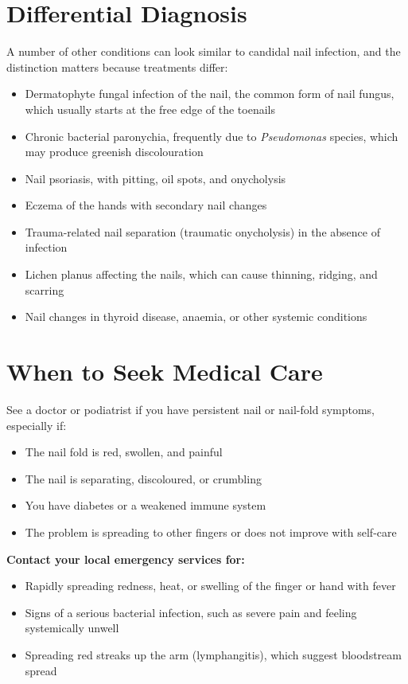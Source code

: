 \section*{Differential Diagnosis}
A number of other conditions can look similar to candidal nail infection, and the distinction matters because treatments differ:
\begin{itemize}
    \item Dermatophyte fungal infection of the nail, the common form of nail fungus, which usually starts at the free edge of the toenails
    \item Chronic bacterial paronychia, frequently due to \textit{Pseudomonas} species, which may produce greenish discolouration
    \item Nail psoriasis, with pitting, oil spots, and onycholysis
    \item Eczema of the hands with secondary nail changes
    \item Trauma-related nail separation (traumatic onycholysis) in the absence of infection
    \item Lichen planus affecting the nails, which can cause thinning, ridging, and scarring
    \item Nail changes in thyroid disease, anaemia, or other systemic conditions
\end{itemize}

\section*{When to Seek Medical Care}
See a doctor or podiatrist if you have persistent nail or nail-fold symptoms, especially if:
\begin{itemize}
    \item The nail fold is red, swollen, and painful
    \item The nail is separating, discoloured, or crumbling
    \item You have diabetes or a weakened immune system
    \item The problem is spreading to other fingers or does not improve with self-care
\end{itemize}
\textbf{Contact your local emergency services for:}
\begin{itemize}
    \item Rapidly spreading redness, heat, or swelling of the finger or hand with fever
    \item Signs of a serious bacterial infection, such as severe pain and feeling systemically unwell
    \item Spreading red streaks up the arm (lymphangitis), which suggest bloodstream spread
\end{itemize}

